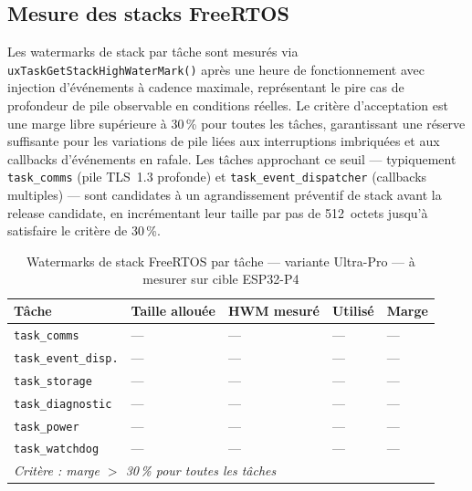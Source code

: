 \subsection{Mesure des stacks FreeRTOS}
\label{subsec:stacks}

Les watermarks de stack par tâche sont mesurés via
\texttt{uxTaskGetStackHighWaterMark()} après une heure de fonctionnement
avec injection d'événements à cadence maximale, représentant le pire
cas de profondeur de pile observable en conditions réelles. Le critère
d'acceptation est une marge libre supérieure à 30\,\% pour toutes
les tâches, garantissant une réserve suffisante pour les variations
de pile liées aux interruptions imbriquées et aux callbacks
d'événements en rafale. Les tâches approchant ce seuil — typiquement
\texttt{task\_comms} (pile TLS~1.3 profonde) et
\texttt{task\_event\_dispatcher} (callbacks multiples) — sont
candidates à un agrandissement préventif de stack avant la release
candidate, en incrémentant leur taille par pas de 512~octets jusqu'à
satisfaire le critère de 30\,\%.

\begin{table}[H]
\centering
\renewcommand{\arraystretch}{1.5}
\caption{Watermarks de stack FreeRTOS par tâche — variante Ultra-Pro — à mesurer sur cible ESP32-P4}
\label{tab:stacks}
\small
\begin{tabular}{|p{4.5cm}|p{2.2cm}|p{2.2cm}|p{2.2cm}|p{1.5cm}|}
\hline
\rowcolor{gray!20}
\textbf{Tâche} & \textbf{Taille allouée} & \textbf{HWM mesuré} & \textbf{Utilisé} & \textbf{Marge} \\
\hline
\texttt{task\_comms}            & — & — & — & — \\
\hline
\texttt{task\_event\_disp.}     & — & — & — & — \\
\hline
\texttt{task\_storage}          & — & — & — & — \\
\hline
\texttt{task\_diagnostic}       & — & — & — & — \\
\hline
\texttt{task\_power}            & — & — & — & — \\
\hline
\texttt{task\_watchdog}         & — & — & — & — \\
\hline
\multicolumn{4}{|l|}{\textit{Critère : marge $>$ 30\,\% pour toutes les tâches}} & \\
\hline
\end{tabular}
\end{table}

